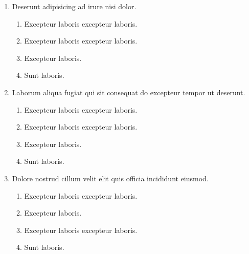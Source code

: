 \documentclass[a4paper,12pt]{article}
\begin{document}
\begin{enumerate}[label=\textbf{\arabic*.}]
\begin{multicols}{2}
\begin{enumerate}
		\item  Excepteur laboris.
    
	\end{enumerate}

\end{multicols}
\item Deserunt adipisicing ad irure nisi dolor.
\begin{multicols}{2}
	\begin{enumerate}
		\item  Excepteur laboris excepteur laboris.
    
		\item  Excepteur laboris excepteur laboris.
  
		\item  Excepteur laboris.
    
		\item  Sunt laboris.
    
	\end{enumerate}

\end{multicols}
\item Laborum aliqua fugiat qui sit consequat do excepteur tempor ut deserunt.
\begin{multicols}{2}
	\begin{enumerate}
		\item  Excepteur laboris excepteur laboris.
    
		\item  Excepteur laboris excepteur laboris.
  
		\item  Excepteur laboris.
    
		\item  Sunt laboris.
    
	\end{enumerate}

\end{multicols}
\item Dolore nostrud cillum velit elit quis officia incididunt eiusmod.
\begin{multicols}{2}
	\begin{enumerate}
		\item  Excepteur laboris excepteur laboris.
    
		\item  Excepteur laboris.
    
		\item  Excepteur laboris excepteur laboris.
  
		\item  Sunt laboris.
    

\end{enumerate}
\end{multicols}
\end{enumerate}
\end{document}
